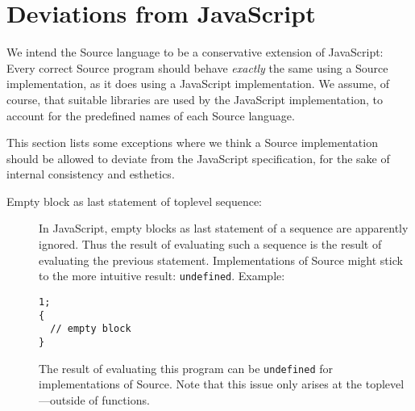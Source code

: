 \section*{Deviations from JavaScript}

We intend the 
Source language to be a conservative extension
of JavaScript: Every correct
Source program should behave \emph{exactly} the same
using a Source implementation, as it does using a JavaScript
implementation. We assume, of course, that suitable libraries are
used by the JavaScript implementation, to account for the predefined names
of each Source language.

This section lists some exceptions where we think a Source implementation
should be allowed to deviate from the JavaScript specification, for the
sake of internal consistency and esthetics.

\begin{description}
\item[Empty block as last statement of toplevel sequence:] In JavaScript,
  empty blocks as last statement of a sequence are apparently
  ignored. Thus the result of evaluating such a sequence is the
  result of evaluating the previous statement. Implementations
  of Source might stick to the more intuitive result: \texttt{undefined}.
  Example:
  \begin{lstlisting}
1;
{
  // empty block
}
  \end{lstlisting}
  The result of evaluating this program can be \texttt{undefined}
  for implementations of Source. Note that this issue only arises
  at the toplevel---outside of functions.
\end{description}
